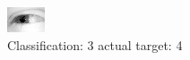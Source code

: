 \begin{figure}[h!]
\begin{center}
\includegraphics[width=0.60\columnwidth]{figures/ID2438_class_3_target_4.png}
\end{center}
\caption{ Classification: 3 actual target: 4}
\label{fig:ID2438_class_3_target_4}
\end{figure}
